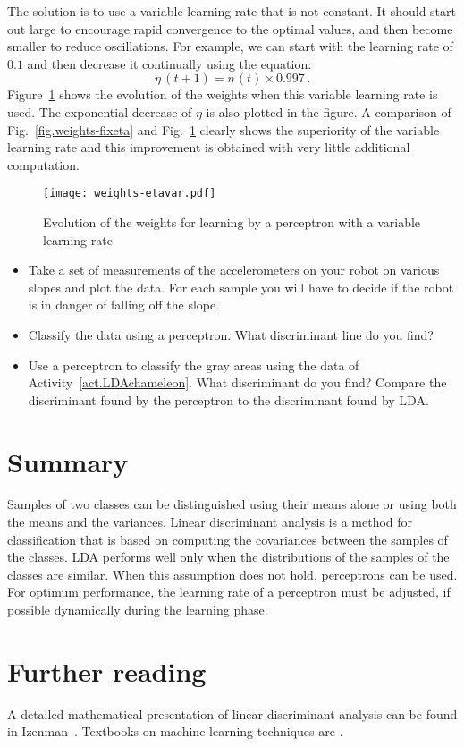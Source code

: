 The solution is to use a variable learning rate that is not constant. It should start out large to encourage rapid convergence to the optimal values, and then become smaller to reduce oscillations. For example, we can start with the learning rate of $0.1$ and then decrease it continually using the equation:
\[
\eta\,(t+1) = \eta\,(t) \times 0.997\,.
\]
Figure~\ref{fig.perceptron-dis-etavar} shows the evolution of the weights when this variable learning rate is used. The exponential decrease of $\eta$ is also plotted in the figure. A comparison of Fig.~\ref{fig.weights-fixeta} and Fig.~\ref{fig.perceptron-dis-etavar} clearly shows the superiority of the variable learning rate and this improvement is obtained with very little additional computation.
\begin{figure}
\begin{center}
\texttt{[image: weights-etavar.pdf]}
\end{center}
\caption{Evolution of the weights for learning by a perceptron with a variable learning rate}\label{fig.perceptron-dis-etavar}
\end{figure}

\begin{framed}
\begin{itemize}
\item Take a set of measurements of the accelerometers on your robot on various slopes and plot the data. For each sample you will have to decide if the robot is in danger of falling off the slope.
\item Classify the data using a perceptron. What discriminant line do you find?
\item Use a perceptron to classify the gray areas using the data of Activity~\ref{act.LDAchameleon}. What discriminant do you find? Compare the discriminant found by the perceptron to the discriminant found by LDA.
\end{itemize}
\end{framed}

\section{Summary}

Samples of two classes can be distinguished using their means alone or using both the means and the variances. Linear discriminant analysis is a method for classification that is based on computing the covariances between the samples of the classes. LDA performs well only when the distributions of the samples of the classes are similar. When this assumption does not hold, perceptrons can be used. For optimum performance, the learning rate of a perceptron must be adjusted, if possible dynamically during the learning phase.

\section{Further reading}

A detailed mathematical presentation of linear discriminant analysis can be found in Izenman~\cite[Chapter~8]{izenman2008}. Textbooks on machine learning techniques are \cite{harrington2012machine, kubat2015machinelearning}.
